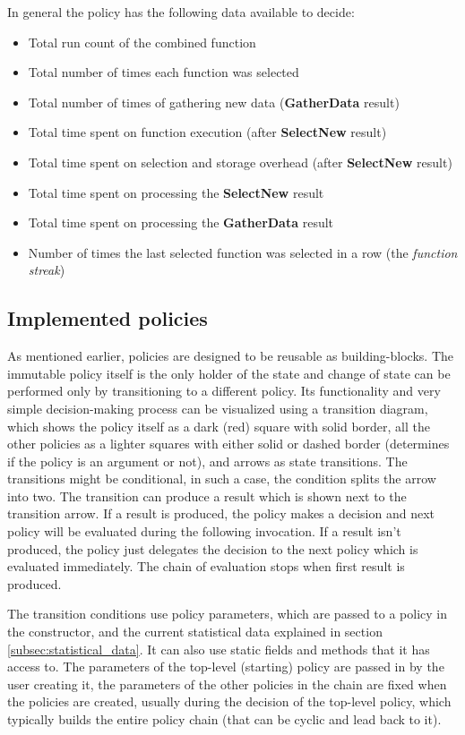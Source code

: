 In general the policy has the following data available to decide:

\begin{itemize}
	\item Total run count of the combined function
	\item Total number of times each function was selected
	\item Total number of times of gathering new data (\textbf{GatherData} result)
	\item Total time spent on function execution (after \textbf{SelectNew} result)
	\item Total time spent on selection and storage overhead (after \textbf{SelectNew} result)
	\item Total time spent on processing the \textbf{SelectNew} result
	\item Total time spent on processing the \textbf{GatherData} result
	\item Number of times the last selected function was selected in a row (the \textit{function streak})
\end{itemize}

\subsection{Implemented policies}

As mentioned earlier, policies are designed to be reusable as building-blocks. The immutable policy itself is the only holder of the state and change of state can be performed only by transitioning to a different policy. Its functionality and very simple decision-making process can be visualized using a transition diagram, which shows the policy itself as a dark (red) square with solid border, all the other policies as a lighter squares with either solid or dashed border (determines if the policy is an argument or not), and arrows as state transitions. The transitions might be conditional, in such a case, the condition splits the arrow into two. The transition can produce a result which is shown next to the transition arrow. If a result is produced, the policy makes a decision and next policy will be evaluated during the following invocation. If a result isn't produced, the policy just delegates the decision to the next policy which is evaluated immediately. The chain of evaluation stops when first result is produced.

The transition conditions use policy parameters, which are passed to a policy in the constructor, and the current statistical data explained in section \ref{subsec:statistical_data}. It can also use static fields and methods that it has access to. The parameters of the top-level (starting) policy are passed in by the user creating it, the parameters of the other policies in the chain are fixed when the policies are created, usually during the decision of the top-level policy, which typically builds the entire policy chain (that can be cyclic and lead back to it).

